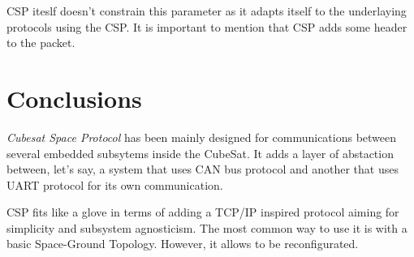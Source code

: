 CSP iteslf doesn't constrain this parameter as it adapts itself to the underlaying protocols using the CSP. It is important to mention that CSP adds some header to the packet.

\section{Conclusions}

\textit{Cubesat Space Protocol} has been mainly designed for communications between several embedded subsytems inside the CubeSat. It adds a layer of abstaction between, let's say, a system that uses CAN bus protocol and another that uses UART protocol for its own communication. 

CSP fits like a glove in terms of adding a TCP/IP inspired protocol aiming for simplicity and subsystem agnosticism.
The most common way to use it is with a basic Space-Ground Topology. However, it allows to be reconfigurated.